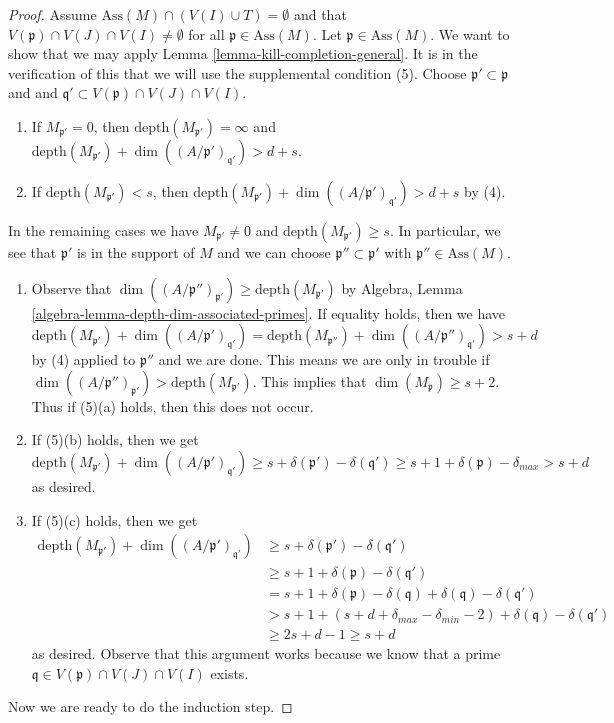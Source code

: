 \begin{proof}
\medskip\noindent
Assume $\text{Ass}(M) \cap (V(I) \cup T) = \emptyset$ and that
$V(\mathfrak p) \cap V(J) \cap V(I) \not = \emptyset$
for all $\mathfrak p \in \text{Ass}(M)$.
Let $\mathfrak p \in \text{Ass}(M)$. We want to show that we may apply
Lemma \ref{lemma-kill-completion-general}.
It is in the verification of this that we will use the supplemental
condition (5). Choose $\mathfrak p' \subset \mathfrak p$ and
and $\mathfrak q' \subset V(\mathfrak p) \cap V(J) \cap V(I)$.
\begin{enumerate}
\item If $M_{\mathfrak p'} = 0$, then
$\text{depth}(M_{\mathfrak p'}) = \infty$ and
$\text{depth}(M_{\mathfrak p'}) +
\dim((A/\mathfrak p')_{\mathfrak q'}) > d + s$.
\item If $\text{depth}(M_{\mathfrak p'}) < s$, then
$\text{depth}(M_{\mathfrak p'}) +
\dim((A/\mathfrak p')_{\mathfrak q'}) > d + s$ by (4).
\end{enumerate}
In the remaining cases we have $M_{\mathfrak p'} \not = 0$ and
$\text{depth}(M_{\mathfrak p'}) \geq s$. In particular, we see that
$\mathfrak p'$ is in the support of $M$ and we can choose
$\mathfrak p'' \subset \mathfrak p'$ with $\mathfrak p'' \in \text{Ass}(M)$.
\begin{enumerate}
\item Observe that
$\dim((A/\mathfrak p'')_{\mathfrak p'}) \geq \text{depth}(M_{\mathfrak p'})$
by Algebra, Lemma \ref{algebra-lemma-depth-dim-associated-primes}.
If equality holds, then we have
$$
\text{depth}(M_{\mathfrak p'}) + \dim((A/\mathfrak p')_{\mathfrak q'}) =
\text{depth}(M_{\mathfrak p''}) + \dim((A/\mathfrak p'')_{\mathfrak q'})
> s + d
$$
by (4) applied to $\mathfrak p''$ and we are done. This means we are
only in trouble if
$\dim((A/\mathfrak p'')_{\mathfrak p'}) > \text{depth}(M_{\mathfrak p'})$.
This implies that $\dim(M_\mathfrak p) \geq s + 2$.
Thus if (5)(a) holds, then this does not occur.
\item If (5)(b) holds, then we get
$$
\text{depth}(M_{\mathfrak p'}) + \dim((A/\mathfrak p')_{\mathfrak q'})
\geq s + \delta(\mathfrak p') - \delta(\mathfrak q')
\geq s + 1 + \delta(\mathfrak p) - \delta_{max}
> s + d
$$
as desired.
\item If (5)(c) holds, then we get
\begin{align*}
\text{depth}(M_{\mathfrak p'}) + \dim((A/\mathfrak p')_{\mathfrak q'})
& \geq
s + \delta(\mathfrak p') - \delta(\mathfrak q') \\
& \geq
s + 1 + \delta(\mathfrak p) - \delta(\mathfrak q') \\
& =
s + 1 + \delta(\mathfrak p) - \delta(\mathfrak q) +
\delta(\mathfrak q) - \delta(\mathfrak q') \\
& >
s + 1 + (s + d + \delta_{max} - \delta_{min} - 2) +
\delta(\mathfrak q) - \delta(\mathfrak q') \\
& \geq 
2s + d - 1 \geq s + d
\end{align*}
as desired. Observe that this argument works because
we know that a prime $\mathfrak q \in V(\mathfrak p) \cap V(J) \cap V(I)$
exists.
\end{enumerate}
Now we are ready to do the induction step.


\end{proof}
